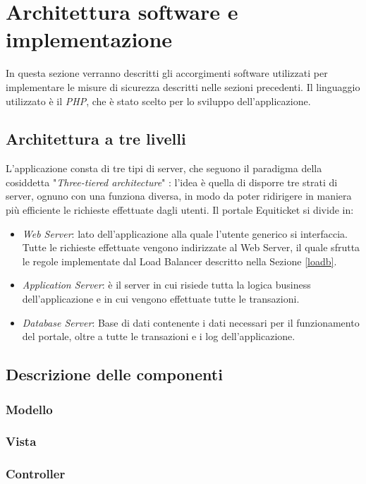\section{Architettura software e implementazione} \label{sec:impl}
In questa sezione verranno descritti gli accorgimenti software utilizzati per implementare le misure di sicurezza descritti nelle sezioni precedenti. Il linguaggio utilizzato è il \emph{PHP}, che è stato scelto per lo sviluppo dell'applicazione. 
\subsection{Architettura a tre livelli}
L'applicazione consta di tre tipi di server, che seguono il paradigma della cosiddetta "\emph{Three-tiered architecture}" \cite{menasce2000scaling}: l'idea è quella di disporre tre strati di server, ognuno con una funziona diversa, in modo da poter ridirigere in maniera più efficiente le richieste effettuate dagli utenti. Il portale Equiticket si divide in: 
\begin{itemize}
\item \emph{Web Server}: lato dell'applicazione alla quale l'utente generico si interfaccia. Tutte le richieste effettuate vengono indirizzate al Web Server, il quale sfrutta le regole implementate dal Load Balancer descritto nella Sezione \ref{loadb}. 
\item	\emph{Application Server}: è il server in cui risiede tutta la logica business dell'applicazione e in cui vengono effettuate tutte le transazioni. 
\item \emph{Database Server}: Base di dati contenente i dati necessari per il funzionamento del portale, oltre a tutte le transazioni e i log dell'applicazione. 
\end{itemize}

\subsection{Descrizione delle componenti}
\subsubsection{Modello}
\subsubsection{Vista}
\subsubsection{Controller}
